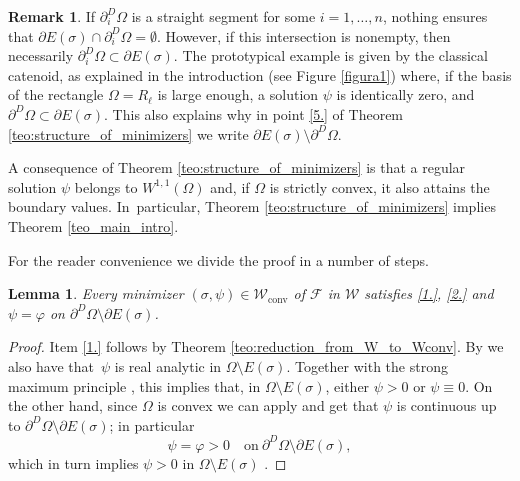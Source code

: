 \documentclass[11pt]{article}
\numberwithin{equation}{section}
\newcommand{\largercomp}{\mathcal W}
\let\Om\Omega
\newcommand\admclassconv{{\mathcal W_\mathrm{conv}}}
\newtheorem{lemma}[theorem]{Lemma}
\theoremstyle{definition}
\newtheorem{remark}[theorem]{Remark}
\begin{document}
\begin{remark}
If $\partial_i^D\Omega$ is a straight segment for some $i=1,\dots,n$,
nothing ensures that $\partial E(\sigma)\cap \partial_i^D\Omega=\emptyset$. However, if this intersection is nonempty, then necessarily
$\partial_i^D\Omega\subset\partial E(\sigma)$. The
prototypical example is given by the classical catenoid, as explained in the introduction (see Figure \ref{figura1}) where, if the basis of the rectangle $\Omega=R_{\ell}$ is large enough, a solution $\psi$ is identically zero, and $\partial^D\Omega\subset\partial E(\sigma)$.
This also explains why in point \ref{5.} of Theorem \ref{teo:structure_of_minimizers} we write $\partial E(\sigma)\setminus \partial^D\Omega$.
\end{remark}

A consequence of Theorem \ref{teo:structure_of_minimizers} is that a regular solution $\psi$ belongs to $W^{1,1}(\Om)$ and, if $\Om$ is strictly convex, it also attains the boundary values. In~particular, Theorem \ref{teo:structure_of_minimizers} implies Theorem \ref{teo_main_intro}.

For the reader convenience we divide the proof in a number of steps.
\begin{lemma}\label{lem:analicity}
Every minimizer $(\sigma,\psi)\in\admclassconv$ of $\mathcal F$ in
$\largercomp$ satisfies \ref{1.}, \ref{2.} and
$\psi=\varphi$ on $\partial^D\Om\setminus\partial E(\sigma)$.
\end{lemma}
\begin{proof} Item \ref{1.} follows by Theorem \ref{teo:reduction_from_W_to_Wconv}.
By \cite[Th.\,14.13]{Giusti:84}
we also have that~$\psi$ is real analytic in $\Om\setminus E(\sigma)$. Together with the strong maximum principle \cite[Th.\,C.4]{Giusti:84}, this implies that,
in $\Om\setminus E(\sigma)$,
either $\psi>0$ or $\psi\equiv0$.
On the other hand,
since $\Omega$ is convex we can apply \cite[Th.\,15.9]{Giusti:84} and get that $\psi$ is continuous up to $\partial^D\Om\setminus\partial E(\sigma)$; in particular
\begin{equation}\label{eq:boundary_value}
\psi=\varphi>0\quad\text{on}\ \partial^D\Omega\setminus\partial E(\sigma),
\end{equation}
which in turn implies $\psi>0$ in $\Omega\setminus E(\sigma)$ .
\end{proof}
\end{document}
